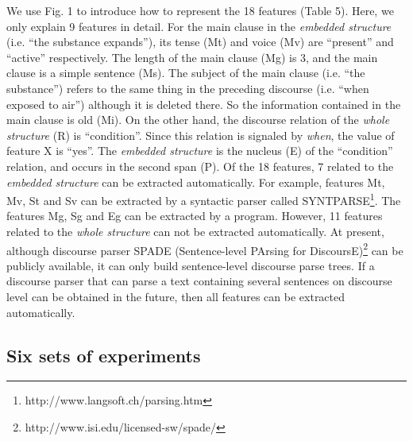 \documentclass[english]{jnlp_1.3e}
\begin{document}
We use Fig. 1 to introduce how to represent the 18 features (Table 5). 
Here, we only explain 9 features in detail. For the main clause in 
the \textit{embedded structure} (i.e. ``the substance expands''), 
its tense (Mt) and voice (Mv) are ``present'' and ``active'' respectively. 
The length of the main clause (Mg) is 3, and the main clause is a 
simple sentence (Ms). The subject of the main clause (i.e. ``the substance'') 
refers to the same thing in the preceding discourse (i.e. ``when exposed to air'') 
although it is deleted there. So the information contained in the
main clause is old (Mi). On the other hand, the discourse relation of 
the \textit{whole structure} (R) is ``condition''. Since this relation 
is signaled by \textit{when}, the value of feature X is ``yes''.
The \textit{embedded structure} is the nucleus (E) of the ``condition'' 
relation, and occurs in the second span (P). Of the 18 features, 7 related 
to the \textit{embedded structure} can be extracted automatically. 
For example, features Mt, Mv, St and Sv can be extracted by a syntactic 
parser called SYNTPARSE\footnote{http://www.langsoft.ch/parsing.htm}. 
The features Mg, Sg and Eg can be extracted by a program. 
However, 11 features related to the \textit{whole structure}
can not be extracted automatically. At present, although 
discourse parser SPADE (Sentence-level PArsing for DiscoursE)\footnote{http://www.isi.edu/licensed-sw/spade/} can be publicly available, it can only build sentence-level discourse 
parse trees. If a discourse parser that can parse a text containing 
several sentences on discourse level can be obtained in the future, 
then all features can be extracted automatically.

\begin{table}[t] 
\caption{18 features and their values of the text shown in Fig. 1}

\vspace{-1\normalbaselineskip}
\end{table}


\subsection{Six sets of experiments}
\end{document}
